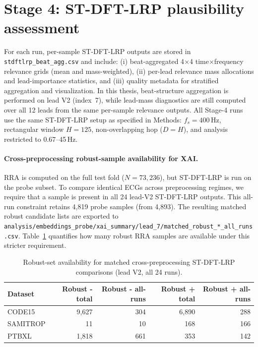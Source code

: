 \section{Stage 4: ST-DFT-LRP plausibility assessment}
For each run, per-sample ST-DFT-LRP outputs are stored in \texttt{stdftlrp\_beat\_agg.csv} and include:
(i) beat-aggregated 4$\times$4 time$\times$frequency relevance grids (mean and mass-weighted),
(ii) per-lead relevance mass allocations and lead-importance statistics, and
(iii) quality metadata for stratified aggregation and visualization.
In this thesis, beat-structure aggregation is performed on lead V2 (index~7), while lead-mass diagnostics are still computed over all 12 leads from the same per-sample relevance outputs.
All Stage-4 runs use the same ST-DFT-LRP setup as specified in Methods: \(f_s=400\)\,Hz, rectangular window \(H=125\), non-overlapping hop (\(D=H\)), and analysis restricted to 0.67--45\,Hz.

\paragraph{Cross-preprocessing robust-sample availability for XAI.}
RRA is computed on the full test fold (\(N=73{,}236\)), but ST-DFT-LRP is run on the probe subset.
To compare identical ECGs across preprocessing regimes, we require that a sample is present in all 24 lead-V2 ST-DFT-LRP outputs.
This all-run constraint retains 4{,}819 probe samples (from 4{,}893).
The resulting matched robust candidate lists are exported to \texttt{analysis/embeddings\_probe/xai\_summary/lead\_7/matched\_robust\_*\_all\_runs.csv}.
Table~\ref{tab:rra_xai_allrun_availability} quantifies how many robust RRA samples are available under this stricter requirement.

\begin{table}[H]
  \centering
  \caption{Robust-set availability for matched cross-preprocessing ST-DFT-LRP comparisons (lead V2, all 24 runs).}
  \label{tab:rra_xai_allrun_availability}
  \begin{tabular}{lrrrr}
    \toprule
    \textbf{Dataset} & \textbf{Robust - total} & \textbf{Robust - all-runs} & \textbf{Robust + total} & \textbf{Robust + all-runs} \\
    \midrule
    CODE15           & 9{,}627                 & 304                        & 6{,}890                 & 288                        \\
    SAMITROP         & 11                      & 10                         & 168                     & 166                        \\
    PTBXL            & 1{,}818                 & 661                        & 353                     & 142                        \\
    \bottomrule
  \end{tabular}
\end{table}

